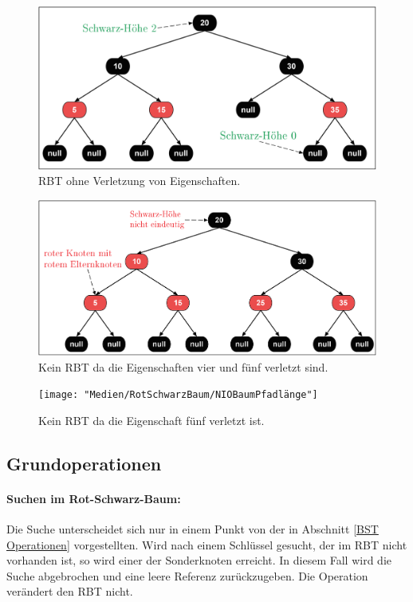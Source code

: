 \documentclass[a4paper,12pt]{article}
\begin{document}
\begin{figure}[H]
	\centering
	\includegraphics[width= 1\textwidth]{"Medien/RotSchwarzBaum/IOBaum"}
	\caption{RBT ohne Verletzung von Eigenschaften. }
	\label{fig:IOBaum}
\end{figure}
\begin{figure}[H]
	\centering
	\includegraphics[width= 1\textwidth]{"Medien/RotSchwarzBaum/NIOBaumZweiRote"}
	\caption{Kein RBT da die Eigenschaften vier und fünf verletzt sind. }
	\label{fig:NIOBaumZweiRote}
\end{figure}
\begin{figure}[H]
	\centering
	\texttt{[image: "Medien/RotSchwarzBaum/NIOBaumPfadlänge"]}
	\caption{Kein RBT da die Eigenschaft fünf verletzt ist.  }
	\label{fig:NIOBaumPfadlänge}
\end{figure}
\subsection{Grundoperationen}
\paragraph{Suchen im Rot-Schwarz-Baum:}
Die Suche unterscheidet sich nur in einem Punkt von der in Abschnitt \ref{BST Operationen} vorgestellten. Wird nach einem Schlüssel gesucht, der im RBT nicht vorhanden ist, so wird einer der Sonderknoten erreicht. In diesem Fall wird die Suche abgebrochen und eine leere Referenz zurückzugeben. Die Operation verändert den RBT nicht. 
\end{document}

